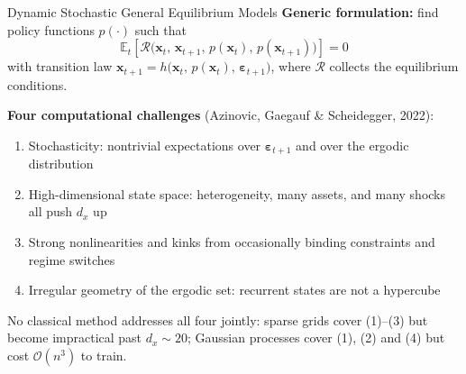 \documentclass[aspectratio=169,11pt]{beamer}
\newcommand{\emphc}[1]{\textcolor{harvardcrimson}{#1}}
\newcommand{\x}{\bm{x}}
\newcommand{\Et}[1]{\mathbb{E}_t\!\left[#1\right]}
\newcommand{\state}{\bm{x}}          %
\newcommand{\resid}{\mathcal{R}}     %
\begin{document}
\begin{frame}{Dynamic Stochastic General Equilibrium Models}
\textbf{Generic formulation:} find policy functions $p(\cdot)$ such that
\[
\Et{\resid\bigl(\state_t,\,\state_{t+1},\,p(\state_t),\,p(\state_{t+1})\bigr)} = 0
\]
with transition law $\state_{t+1} = h\bigl(\state_t,\,p(\state_t),\,\bm\varepsilon_{t+1}\bigr)$, where $\resid$ collects the equilibrium conditions.

\vspace{0.4em}
\textbf{Four computational challenges} (Azinovic, Gaegauf \& Scheidegger, 2022):
\begin{enumerate}
    \setlength{\itemsep}{1pt}
    \item \emphc{Stochasticity}: nontrivial expectations over $\bm\varepsilon_{t+1}$ and over the ergodic distribution
    \item \emphc{High-dimensional} state space: heterogeneity, many assets, and many shocks all push $d_x$ up
    \item \emphc{Strong nonlinearities and kinks} from occasionally binding constraints and regime switches
    \item \emphc{Irregular geometry} of the ergodic set: recurrent states are not a hypercube
\end{enumerate}

\vspace{0.2em}
{\footnotesize No classical method addresses all four jointly: sparse grids cover (1)--(3) but become impractical past $d_x \sim 20$; Gaussian processes cover (1), (2) and (4) but cost $\mathcal{O}(n^3)$ to train.}
\end{frame}
\end{document}
